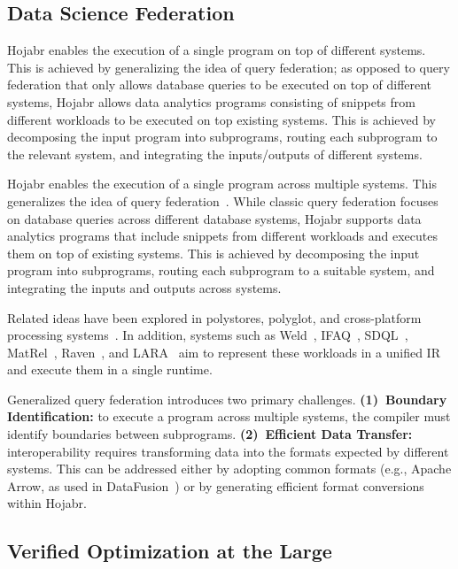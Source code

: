 \documentclass[sigconf,nonacm]{acmart}
\begin{document}
\subsection{Data Science Federation}
\label{sec:federation}
Hojabr enables the execution of a single program on top of different systems. This is achieved by generalizing the idea of query federation; as opposed to query federation that only allows database queries to be executed on top of different systems, Hojabr allows data analytics programs consisting of snippets from different workloads to be executed on top existing systems. This is achieved by decomposing the input program into subprograms, routing each subprogram to the relevant system, and integrating the inputs/outputs of different systems.

Hojabr enables the execution of a single program across multiple systems. This generalizes the idea of query federation~\cite{sheth1990federated}. While classic query federation focuses on database queries across different database systems, Hojabr supports data analytics programs that include snippets from different workloads and executes them on top of existing systems. This is achieved by decomposing the input program into subprograms, routing each subprogram to a suitable system, and integrating the inputs and outputs across systems.

Related ideas have been explored in polystores, polyglot, and cross-platform processing systems~\cite{duggan2015bigdawg,dewitt2013split,kaoudi2022unified,kiehn2022polyglot,polystore_query_lang}. In addition, systems such as Weld~\cite{palkar2017weld}, IFAQ~\cite{shaikhha2020multi,shaikhha2021intermediate}, SDQL~\cite{DBLP:journals/pacmpl/ShaikhhaHSO22,shahrokhi2023building}, MatRel~\cite{matrel}, Raven~\cite{raven}, and LARA~\cite{laradb} aim to represent these workloads in a unified IR and execute them in a single runtime.

Generalized query federation introduces two primary challenges. \textbf{(1)~Boundary Identification:} to execute a program across multiple systems, the compiler must identify boundaries between subprograms. \textbf{(2)~Efficient Data Transfer:} interoperability requires transforming data into the formats expected by different systems. This can be addressed either by adopting common formats (e.g., Apache Arrow, as used in DataFusion~\cite{lamb2024apache}) or by generating efficient format conversions within Hojabr.


\subsection{Verified Optimization at the Large}
\label{sec:lifting}
\end{document}

